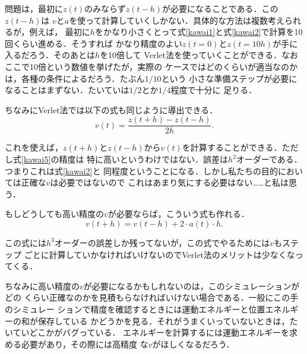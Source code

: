 問題は，最初に$z(t)$のみならず$z(t-h)$が必要になることである．この$z(t-h)$は
$v$と$a$を使って計算していくしかない．具体的な方法は複数考えられるが，例えば，
最初に$h$をかなり小さくとって式\eqref{kawai1}と式\eqref{kawai2}で計算を10回くらい進める．そうすれば
かなり精度のよい$z(t=0)$と$z(t=10h)$が手に入るだろう．そのあとは$h$を10倍して
Verlet法を使っていくことができる．なおここで10倍という数値を挙げたが，実際の
ケースではどのくらいが適当なのかは，各種の条件によるだろう．たぶん$1/10$という
小さな準備ステップが必要になることはまずない．たいていは$1/2$とか$1/4$程度で十分に
足りる．

  ちなみにVerlet法では以下の式も同じように導出できる．
\begin{equation}\label{kawai5}
    v(t) = \frac{z(t+h) - z(t-h)}{2h}.
\end{equation}

これを使えば，$z(t+h)$と$z(t-h)$から$v(t)$を計算することができる．ただし式\eqref{kawai5}の精度は
特に高いというわけではない．誤差は$h^2$オーダーである．つまりこれは式\eqref{kawai2}と
同程度ということになる．しかし私たちの目的においては正確な$v$は必要ではないので
これはあまり気にする必要はない……と私は思う．

  もしどうしても高い精度の$v$が必要ならば，こういう式も作れる．
\begin{equation}\label{kawai6}
    v(t+h) = v(t-h) + 2 \cdot a(t) \cdot h.
\end{equation}

この式には$h^3$オーダーの誤差しか残ってないが，この式でやるためには$v$もステップ
ごとに計算していかなければいけないのでVerlet法のメリットは少なくなってくる．

  ちなみに高い精度の$v$が必要になるかもしれないのは，このシミュレーションがどの
くらい正確なのかを見積もらなければいけない場合である．一般にこの手のシミュレー
ションで精度を確認するときには運動エネルギーと位置エネルギーの和が保存している
かどうかを見る．それがうまくいっていないときは，たいていどこかがバグっている．
エネルギーを計算するには運動エネルギーを求める必要があり，その際には高精度
な$v$がほしくなるだろう．
